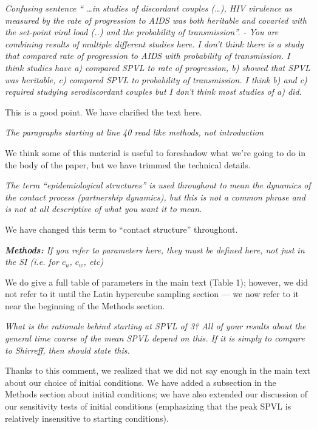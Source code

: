 \documentclass[10pt]{letter}
\newcommand{\revcomment}[1]{\emph{#1}}
\newcommand{\response}[1]{#1}
\begin{document}
\begin{letter}{
}
\revcomment{
Confusing sentence “ …in studies of discordant couples (…), HIV virulence as measured by the rate of progression to AIDS was both heritable and covaried with the set-point viral load (..) and the probability of transmission”.
- You are combining results of multiple different studies here. I don’t think there is a study that compared rate of progression to AIDS with probability of transmission. I think studies have a) compared SPVL to rate of progression, b) showed that SPVL was heritable, c) compared SPVL to probability of transmission. I think b) and c) required studying serodiscordant couples but I don’t think most studies of a) did.
}

\response{
This is a good point. We have clarified the text here.
}

\revcomment{
The paragraphs starting at line 40 read like methods, not introduction
}

\response{
We think some of this material is useful to foreshadow what we're
going to do in the body of the paper, but we have trimmed the
technical details.
}

\revcomment{
The term “epidemiological structures” is used throughout to mean the dynamics of the contact process (partnership dynamics), but this is not a common phrase and is not at all descriptive of what you want it to mean.
}

\response{We have changed this term to ``contact structure'' throughout.}

\revcomment{\textbf{Methods:}
If you refer to parameters here, they must be defined here, not just in the SI (i.e. for $c_u$, $c_w$, etc)
}

\response{We do give a full table of parameters in the main text (Table 1); 
however, we did not refer to it until the Latin hypercube sampling section --- %
we now refer to it near the beginning of the Methods section.}

\revcomment{
What is the rationale behind starting at SPVL of 3? All of your results about the general time course of the mean SPVL depend on this. If it is simply to compare to Shirreff, then should state this.
}

\response{Thanks to this comment, we realized that we did not say enough in the main text about our choice of initial conditions.  We have added a subsection in the Methods section about initial conditions; we have also extended our discussion of our sensitivity tests of initial conditions (emphasizing that the peak SPVL is relatively insensitive to starting conditions).
}


\end{letter}
\end{document}
